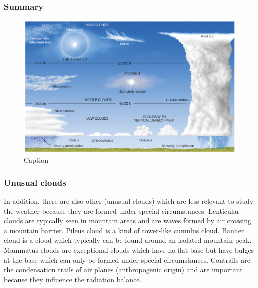 \documentclass[12pt,oneside]{book}
\begin{document}
\subsubsection{Summary}\label{summary}

\begin{figure}

{\centering \includegraphics[width=1\linewidth]{figures/Figure257} 

}

\caption{Caption}\label{fig:CLOUDSUM}
\end{figure}

\subsubsection{Unusual clouds}\label{unusual-clouds}

In addition, there are also other (unusual clouds) which are less
relevant to study the weather because they are formed under special
circumstances. Lenticular clouds are typically seen in mountain areas
and are waves formed by air crossing a mountain barrier. Pileus cloud is
a kind of tower-like cumulus cloud. Banner cloud is a cloud which
typically can be found around an isolated mountain peak. Mammatus clouds
are exceptional clouds which have no flat base but have bulges at the
base which can only be formed under special circumstances. Contrails are
the condensation trails of air planes (anthropogenic origin) and are
important because they influence the radiation balance.
\end{document}
